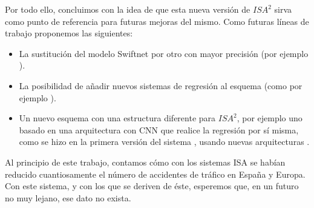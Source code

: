 
Por todo ello, concluimos con la idea de que esta nueva versión de $ISA^{2}$ sirva como punto de referencia para futuras mejoras del mismo. Como futuras líneas de trabajo proponemos las siguientes:

\begin{itemize}
\item La sustitución del modelo Swiftnet por otro con mayor precisión (por ejemplo \cite{hierarchical-multiscale}).
\item La posibilidad de añadir nuevos sistemas de regresión al esquema (como por ejemplo \cite{ridge}).
\item Un nuevo esquema con una estructura diferente para $ISA^{2}$, por ejemplo uno basado en una arquitectura con \ac{CNN} que realice la regresión por sí misma, como se hizo en la primera versión del sistema \cite{isa2}, usando nuevas arquitecturas \cite{cnn-ss}.
\end{itemize}

Al principio de este trabajo, contamos cómo con los sistemas \ac{ISA} se habían reducido cuantiosamente el número de accidentes de tráfico en España y Europa. Con este sistema, y con los que se deriven de éste, esperemos que, en un futuro no muy lejano, ese dato no exista.
